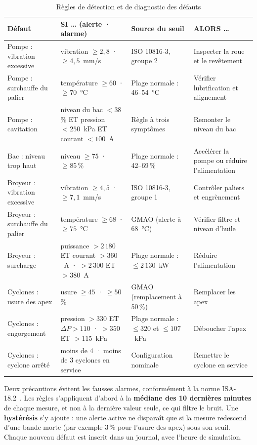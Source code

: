 \begin{table}[H]
\centering
\caption{Règles de détection et de diagnostic des défauts}
\label{tab:regles}
\scriptsize
\begin{tabularx}{\textwidth}{>{\raggedright\arraybackslash}p{2.6cm} >{\raggedright\arraybackslash}X >{\raggedright\arraybackslash}p{3.2cm} >{\raggedright\arraybackslash}p{3.4cm}}
\toprule
\textbf{Défaut} & \textbf{SI \dots{} (alerte · alarme)} & \textbf{Source du seuil} & \textbf{ALORS \dots{}} \\
\midrule
Pompe : vibration excessive & vibration $\geq 2{,}8$ · $\geq 4{,}5$~mm/s & ISO 10816-3, groupe 2 & Inspecter la roue et le revêtement \\
Pompe : surchauffe du palier & température $\geq 60$ · $\geq 70$~°C & Plage normale : 46--54~°C & Vérifier lubrification et alignement \\
Pompe : cavitation & niveau du bac $< 38$\,\% ET pression $< 250$~kPa ET courant $< 100$~A & Règle à trois symptômes & Remonter le niveau du bac \\
Bac : niveau trop haut & niveau $\geq 75$ · $\geq 85$\,\% & Plage normale : 42--69\,\% & Accélérer la pompe ou réduire l'alimentation \\
Broyeur : vibration excessive & vibration $\geq 4{,}5$ · $\geq 7{,}1$~mm/s & ISO 10816-3, groupe 1 & Contrôler paliers et engrènement \\
Broyeur : surchauffe du palier & température $\geq 68$ · $\geq 75$~°C & GMAO (alerte à 68~°C) & Vérifier filtre et niveau d'huile \\
Broyeur : surcharge & puissance $> 2\,180$ ET courant $> 360$~A · $> 2\,300$ ET $> 380$~A & Plage normale : $\leq 2\,130$~kW & Réduire l'alimentation \\
Cyclones : usure des apex & usure $\geq 45$ · $\geq 50$\,\% & GMAO (remplacement à 50\,\%) & Remplacer les apex \\
Cyclones : engorgement & pression $> 330$ ET $\Delta P > 110$ · $> 350$ ET $> 115$~kPa & Plage normale : $\leq 320$ et $\leq 107$~kPa & Déboucher l'apex \\
Cyclones : cyclone arrêté & moins de 4 · moins de 3 cyclones en service & Configuration nominale & Remettre le cyclone en service \\
\bottomrule
\end{tabularx}
\end{table}

Deux précautions évitent les fausses alarmes, conformément à la norme ISA-18.2~\cite{isa182}. Les règles s'appliquent d'abord à la \textbf{médiane des 10 dernières minutes} de chaque mesure, et non à la dernière valeur seule, ce qui filtre le bruit. Une \textbf{hystérésis} s'y ajoute : une alerte active ne disparaît que si la mesure redescend d'une bande morte (par exemple 3\,\% pour l'usure des apex) sous son seuil. Chaque nouveau défaut est inscrit dans un journal, avec l'heure de simulation.

